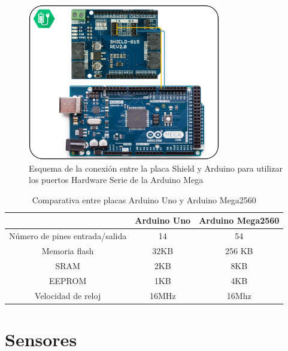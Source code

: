     \begin{figure}[H]
    	\centering
    	\includegraphics[width=0.75\textwidth]{figuras/Imagenes_Electronica/Shield-Arduino-Conection.jpg}
    	\caption{Esquema de la conexión entre la placa Shield y Arduino para utilizar los puertos Hardware Serie de la Arduino Mega}
    	\label{fig:Electronica:shield-arduino}
    \end{figure}
    
    \begin{table}[H]
       	\caption{Comparativa entre placas Arduino Uno y Arduino Mega2560}
       	\label{tab:arduino_comparison}
       		\begin{center}
       			\begin{tabular}{ |c|c|c| }
       				\hline
       				&\textbf{Arduino Uno}&\textbf{Arduino Mega2560} \\
       				\hline
       				Número de pines entrada/salida & 14 & 54 \\
       				\hline
       				Memoria flash & 32KB & 256 KB \\
       				\hline
       				SRAM & 2KB & 8KB \\
       				\hline
       				EEPROM & 1KB & 4KB \\
       				\hline
       				Velocidad de reloj & 16MHz & 16Mhz \\
       				\hline
       			\end{tabular}
       		\end{center}
    \end{table}

\section{Sensores} \label{sec:Electronica:Sensores}
